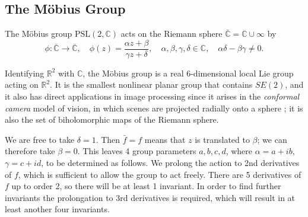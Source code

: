 \documentclass[review,onefignum,onetabnum]{siamonline190516}
\def\R{\mathbb{R}}
\begin{document}
{\subsection{The M\"{o}bius Group}

The M\"obius group $\mathrm{PSL}(2,\mathbb{C})$ acts on the Riemann sphere
$\overline{\mathbb{C}} = \mathbb{C}\cup\infty$ by 
$$ \phi\colon \overline{\mathbb{C}} \to \overline{\mathbb{C}},\quad \phi(z) = \frac{\alpha z + \beta}{\gamma z + \delta},\quad \alpha,\beta,\gamma,\delta\in\mathbb{C}, \quad
\alpha\delta-\beta\gamma\ne 0.$$

Identifying $\R^2$ with $\mathbb{C}$, the M\"obius group is a real 6-dimensional local Lie group acting on $\mathbb{R}^2$.
It is the smallest nonlinear planar group that contains $SE(2)$, and it also has direct applications in image processing since it arises in the {\em conformal camera} model of vision, in which scenes are projected radially onto a sphere \cite{lenz1990group,turski2004geometric}; it is also the set of biholomorphic maps of the Riemann sphere. 

We are free to take $\delta=1$. Then $\bar f = f$ means that $z$ is translated to $\beta$; we can therefore take $\beta=0$. This leaves 4 group parameters $a,b,c,d$, where $\alpha = a + i b$, $\gamma = c + i d$, to be determined as follows. We prolong the action to 2nd derivatives of $f$, which is sufficient to allow the group to act freely. There are 5 derivatives of $f$ up to order 2, so there will be at least 1 invariant. In order to find further invariants the prolongation to 3rd derivatives is required, which will result in at least another four invariants. %

}
\end{document}
